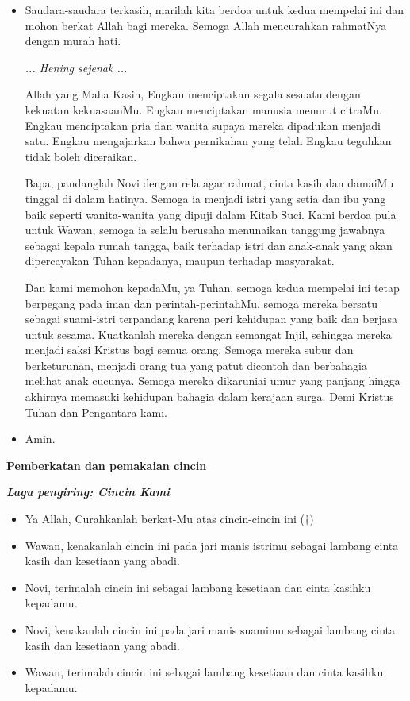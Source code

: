 \documentclass[10pt]{book}
\makeatletter
\newcommand{\subjudul}[1]{%
  {\parindent \z@ \normalfont
    \interlinepenalty\@M \bfseries #1\par\nobreak \vskip 20\p@ }}
\newcommand{\lagu}[1]{%
  {\parindent \z@ \normalfont
    \interlinepenalty\@M \bfseries \emph{#1}\par\nobreak \vskip 20\p@ }}
\newcommand{\BU}[1]{\begin{itemize} \item[U:] #1 \end{itemize}}
\newcommand{\BI}[1]{\begin{itemize} \item[I:] #1 \end{itemize}}
\newcommand{\BL}[1]{\begin{itemize} \item[Wawan:] #1 \end{itemize}}
\newcommand{\BW}[1]{\begin{itemize} \item[Novi:] #1 \end{itemize}}
\makeatother
\begin{document}
\BI{Saudara-saudara terkasih, marilah kita berdoa untuk kedua mempelai ini dan mohon berkat Allah bagi mereka. Semoga Allah mencurahkan rahmatNya dengan murah hati.

		 \emph{... Hening sejenak ...}
		 
		Allah yang Maha Kasih, Engkau menciptakan segala sesuatu dengan kekuatan kekuasaanMu. Engkau menciptakan manusia menurut citraMu. Engkau menciptakan pria dan wanita supaya mereka dipadukan menjadi satu. Engkau mengajarkan bahwa pernikahan yang telah Engkau teguhkan tidak boleh diceraikan.

		Bapa, pandanglah Novi dengan rela agar rahmat, cinta kasih dan damaiMu tinggal di dalam hatinya.  Semoga ia menjadi istri yang setia dan ibu yang baik seperti wanita-wanita yang dipuji dalam Kitab Suci.
		Kami berdoa pula untuk Wawan, semoga ia selalu berusaha menunaikan tanggung jawabnya sebagai kepala rumah tangga, baik terhadap istri dan anak-anak yang akan  dipercayakan Tuhan kepadanya, maupun terhadap masyarakat.

		Dan kami memohon kepadaMu, ya Tuhan, semoga kedua mempelai ini tetap berpegang pada iman dan perintah-perintahMu, semoga mereka bersatu sebagai suami-istri terpandang karena peri kehidupan yang baik dan berjasa untuk sesama.
		Kuatkanlah mereka dengan semangat Injil, sehingga mereka menjadi saksi Kristus bagi semua orang. Semoga mereka subur dan berketurunan, menjadi orang tua yang patut dicontoh dan berbahagia melihat anak cucunya.  Semoga mereka dikaruniai umur yang panjang hingga akhirnya memasuki kehidupan bahagia dalam kerajaan surga. Demi Kristus Tuhan dan Pengantara kami.}

\BU{Amin.}

\subjudul{Pemberkatan dan pemakaian cincin}

\lagu{Lagu pengiring: Cincin Kami}

\BI{Ya Allah, Curahkanlah berkat-Mu atas cincin-cincin ini (\Large{$\dagger)$}}

\BI{Wawan, kenakanlah cincin ini pada jari manis istrimu sebagai lambang cinta kasih dan kesetiaan yang abadi.} 

\BL{Novi, terimalah cincin ini sebagai lambang kesetiaan dan cinta kasihku kepadamu.}  
		
\BI{Novi, kenakanlah cincin ini pada jari manis suamimu sebagai lambang cinta kasih dan kesetiaan yang abadi.} 

\BW{Wawan, terimalah cincin ini sebagai lambang kesetiaan dan cinta kasihku kepadamu.}  
		
\end{document}
